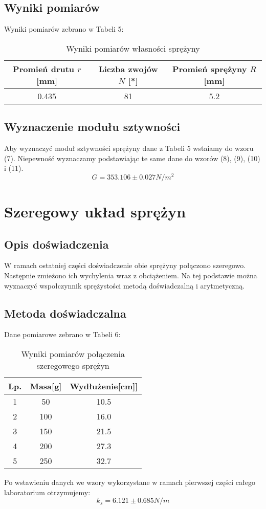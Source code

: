\documentclass{article} %
\begin{document}
\subsection{Wyniki pomiarów}
Wyniki pomiarów zebrano w Tabeli 5:
\begin{center}
\begin{table}[h!]
\centering
\label{tab:coefficients}
\begin{tabular}{|c|c|c|}
\hline
\textbf{Promień drutu \( r \) [mm]} & \textbf{Liczba zwojów \( N \) [*]} &\textbf{Promień sprężyny $R$[mm]}\\ 
\hline
0.435 & 81 & 5.2 \\
\hline
\end{tabular}
\caption{Wyniki pomiarów własności sprężyny}
\end{table}
\end{center}
\subsection{Wyznaczenie modułu sztywności}
Aby wyznaczyć moduł sztywności sprężyny dane z Tabeli 5 wstaiamy do wzoru (7). Niepewność wyznaczamy podstawiając te same dane do wzorów (8), (9), (10) i (11).
{\large
\begin{equation}
    G=353.106\pm0.027N/m^2
\end{equation}
}
\section{Szeregowy układ sprężyn}
\subsection{Opis doświadczenia}
W ramach ostatniej części doświadczenie obie sprężyny połączono szeregowo. Następnie zmieżono ich wychylenia wraz z obciążeniem. Na tej podstawie można wyznaczyć wspołczynnik sprężystości metodą doświadczalną i arytmetyczną.
\subsection{Metoda doświadczalna}
Dane pomiarowe zebrano w Tabeli 6:
\begin{center}
\begin{table}[h!]
\centering
\label{tab:coefficients}
\begin{tabular}{|c|c|c|}
\hline
\textbf{Lp.} & \textbf{Masa[g]} &\textbf{Wydłużenie[cm]]}\\ 
\hline
1 & 50 & 10.5 \\
2 & 100 & 16.0 \\
3 & 150 & 21.5 \\
4 & 200 & 27.3 \\
5 & 250 & 32.7 \\
\hline
\end{tabular}
\caption{Wyniki pomiarów połączenia szeregowego sprężyn}
\end{table}
\end{center}
Po wstawieniu danych we wzory wykorzystane w ramach pierwszej części całego laboratorium otrzymujemy:
{\large
\begin{equation}
    k_s = 6.121\pm0.685N/m
\end{equation}
}
\end{document}
